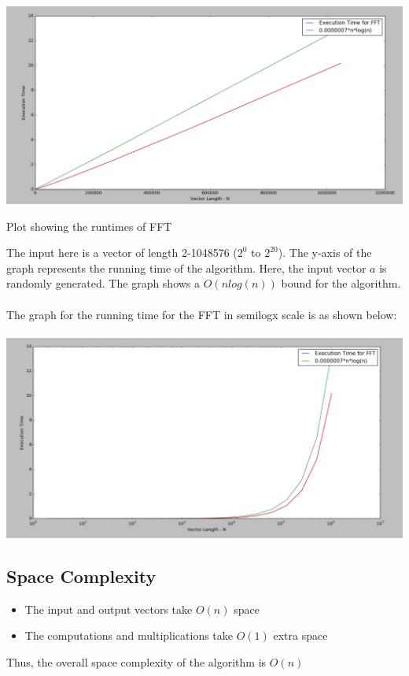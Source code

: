 \documentclass{article}
\begin{document}
\includegraphics[scale=0.3]{fft}
\begin{center}
Plot showing the runtimes of FFT
\end{center}
The input here is a vector of length 2-1048576 ($2^{0}$ to $2^{20}$). The y-axis of the graph represents the running time of the algorithm. Here, the input vector $a$ is randomly generated. The graph shows a $O(nlog(n))$ bound for the algorithm. \\ \\
The graph for the running time for the FFT in semilogx scale is as shown below: \\ \\
\includegraphics[scale=0.3]{fft-logscale}

\subsection{Space Complexity}
\begin{itemize}
\item
The input and output vectors take $O(n)$ space
\item
The computations and multiplications take $O(1)$ extra space
\end{itemize}

Thus, the overall space complexity of the algorithm is $O(n)$
\end{document}
